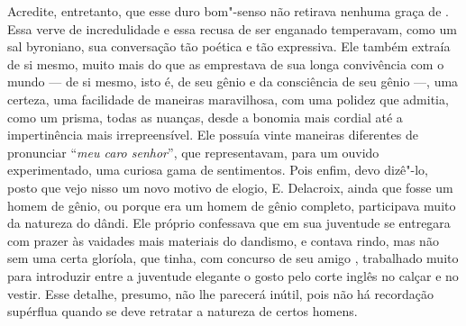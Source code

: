 Acredite, entretanto, que esse duro bom"-senso não retirava nenhuma graça
de . Essa verve de incredulidade e essa recusa de ser enganado
temperavam, como um sal byroniano, sua conversação tão poética e tão
expressiva. Ele também extraía de si mesmo, muito mais do que as
emprestava de sua longa convivência com o mundo --- de si mesmo, isto é,
de seu gênio e da consciência de seu gênio ---, uma certeza, uma
facilidade de maneiras maravilhosa, com uma polidez que admitia, como
um prisma, todas as nuanças, desde a bonomia mais cordial até a
impertinência mais irrepreensível. Ele possuía vinte maneiras
diferentes de pronunciar “\textit{meu caro senhor}”, que representavam,
para um ouvido experimentado, uma curiosa gama de sentimentos. Pois
enfim, devo dizê"-lo, posto que vejo nisso um novo motivo de elogio, E.
Delacroix, ainda que fosse um homem de gênio, ou porque era um homem de
gênio completo, participava muito da natureza do dândi. Ele próprio
confessava que em sua juventude se entregara com prazer às vaidades
mais materiais do dandismo, e contava rindo, mas não sem uma certa
gloríola, que tinha, com concurso de seu amigo , trabalhado
muito para introduzir entre a juventude elegante o gosto pelo corte
inglês no calçar e no vestir. Esse detalhe, presumo, não lhe parecerá
inútil, pois não há recordação supérflua quando se deve retratar a
natureza de certos homens.

